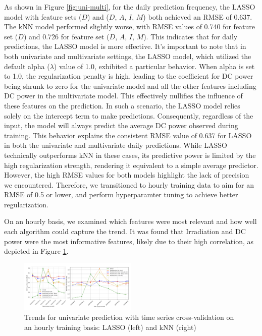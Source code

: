 As shown in Figure \ref{fig:uni-multi}, for the daily prediction frequency, the LASSO model with feature sets ($D$) and ($D$, $A$, $I$, $M$) both achieved an RMSE of 0.637. The kNN model performed slightly worse, with RMSE values of 0.740 for feature set ($D$) and 0.726 for feature set ($D$, $A$, $I$, $M$). This indicates that for daily predictions, the LASSO model is more effective. It's important to note that in both univariate and multivariate settings, the LASSO model, which utilized the default alpha (\(\lambda\)) value of 1.0, exhibited a particular behavior. When alpha is set to 1.0, the regularization penalty is high, leading to the coefficient for DC power being shrunk to zero for the univariate model and all the other features including DC power in the multivariate model. This effectively nullifies the influence of these features on the prediction. In such a scenario, the LASSO model relies solely on the intercept term to make predictions. Consequently, regardless of the input, the model will always predict the average DC power observed during training.
This behavior explains the consistent RMSE value of 0.637 for LASSO in both the univariate and multivariate daily predictions. While LASSO technically outperforms kNN in these cases, its predictive power is limited by the high regularization strength, rendering it equivalent to a simple average predictor. However, the high RMSE values for both models highlight the lack of precision we encountered. Therefore, we transitioned to hourly training data to aim for an RMSE of 0.5 or lower, and perform hyperparamter tuning to achieve better regularization.

On an hourly basis, we examined which features were most relevant and how well each algorithm could capture the trend. It was found that Irradiation and DC power were the most informative features, likely due to their high correlation, as depicted in Figure \ref{fig:hourDC}.

\begin{figure}[h]
    \centering
    \includegraphics[width=0.5\textwidth]{Figures/hourDC.png}
    \caption{Trends for univariate prediction with time series cross-validation on an hourly training basis: LASSO (left) and kNN (right)}
    \label{fig:hourDC}
\end{figure}

